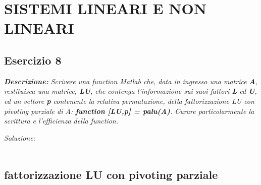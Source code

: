 \chapter{SISTEMI LINEARI E NON LINEARI}
\section{Esercizio 8}
\textit{\textbf{Descrizione:} Scrivere una function Matlab che, data in ingresso una matrice \textbf{A}, restituisca una matrice, \textbf{LU}, che contenga l'informazione sui suoi fattori \textbf{L} ed \textbf{U}, ed un vettore \textbf{p} contenente la relativa permutazione, della fattorizzazione LU con pivoting parziale di A: \textbf{function [LU,p] = palu(A)}. Curare particolarmente la scrittura e l'efficienza della function.}\newline

\emph{Soluzione:}\\~\\

\section*{fattorizzazione LU con pivoting parziale}

\newpage
